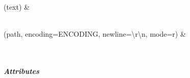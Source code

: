 \documentclass[letterpaper,10pt,english]{sphinxmanual}
\begin{document}
\begin{savenotes}\sphinxatlongtablestart\begin{longtable}[c]{}
\hline

\endfirsthead

%
{}\\
\hline

\endhead

\hline
{}\\
\endfoot

\endlastfoot

\sphinxAtStartPar
{\hyperref[\detokenize{autoapi/pine/backend/pineiaa/bratiaa/utils/index:pine.backend.pineiaa.bratiaa.utils.tokenize}]{}}(text)
&
\sphinxAtStartPar

\\
\hline
\sphinxAtStartPar
{\hyperref[\detokenize{autoapi/pine/backend/pineiaa/bratiaa/utils/index:pine.backend.pineiaa.bratiaa.utils.read}]{}}(path, encoding=ENCODING, newline=\textquotesingle{}\textbackslash{}r\textbackslash{}n\textquotesingle{}, mode=\textquotesingle{}r\textquotesingle{})
&
\sphinxAtStartPar

\\
\hline
\end{longtable}\sphinxatlongtableend\end{savenotes}


\subparagraph{Attributes}
\label{\detokenize{autoapi/pine/backend/pineiaa/bratiaa/utils/index:attributes}}
\end{document}
